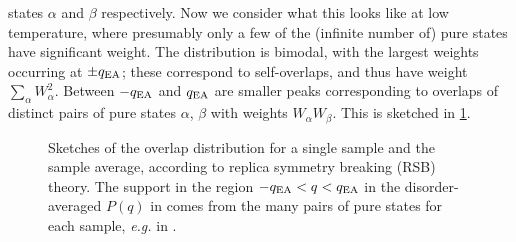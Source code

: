 states $\alpha$ and $\beta$ respectively. Now we consider what this looks like
at low temperature, where presumably only a few of the (infinite number of)
pure states have significant weight. The distribution is bimodal, with the
largest weights occurring at $\pm q_{\mathrm{EA}}$; these correspond to self-overlaps, and
thus have weight $\sum_{\alpha} W_{\alpha}^2$. Between $-q_{\mathrm{EA}}$ and $q_{\mathrm{EA}}$ are
smaller peaks corresponding to overlaps of distinct pairs of pure states
$\alpha$, $\beta$ with weights $W_{\alpha} W_{\beta}$. This is sketched in
\cref{fig:pq-rsb-sample}.
\begin{figure}
  \centering
  \begin{subfigure}{0.49\textwidth}
    \centering
    \label{fig:pq-rsb-sample}
  \end{subfigure}
  \begin{subfigure}{0.49\textwidth}
    \centering
    \label{fig:pq-rsb-dav}
  \end{subfigure}
  \caption[
    Sketches of the overlap distribution for a single sample and the sample
    average, according to replica symmetry breaking (RSB) theory.
  ]
  {
    Sketches of the overlap distribution for  a
    single sample and  the sample average, according to
    replica symmetry breaking (RSB) theory. The support in the region
    $-q_{\mathrm{EA}}<q<q_{\mathrm{EA}}$ in the disorder-averaged $P(q)$ in 
    comes from the many pairs of pure states for each sample, \textit{e.g.} in
    .
  }
\end{figure}

